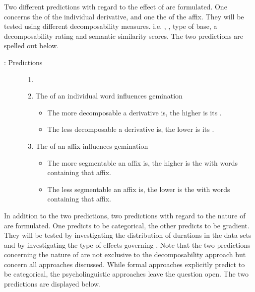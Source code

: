 Two different predictions with regard to the effect of  are formulated. One concerns the  of the individual derivative, and one the  of the affix. They will be tested using different decomposability measures. i.e.  , , type of base, a decomposability rating and semantic similarity scores. The two predictions are spelled out below.


\begin{description}
\item[: Predictions]
\begin{enumerate}[leftmargin=*,label=\Alph*:]
    \item[]
 	\item The  of an individual word influences gemination
        \begin{itemize}[leftmargin=*]
        \item The more decomposable a derivative is, the higher is its .
        \item The less decomposable a derivative is, the lower is its .
        \end{itemize}
        
    \item The  of an affix influences gemination
        \begin{itemize}[leftmargin=*]
        \item The more segmentable an affix is, the higher is the  with words containing that affix. 
        \item The less segmentable an affix is, the lower is the  with words containing that affix.
        \end{itemize}
\end{enumerate}
\end{description}

In addition to the two  predictions, two predictions with regard to the nature of  are formulated. One predicts  to be categorical, the other predicts  to be gradient. They will be tested by investigating the distribution of durations in the data sets and by investigating the type of effects governing . Note that the two predictions concerning the nature of  are not exclusive to the decomposability approach but concern all approaches discussed. While formal approaches explicitly predict  to be categorical, the psycholinguistic approaches leave the question open. The two predictions are displayed below.


